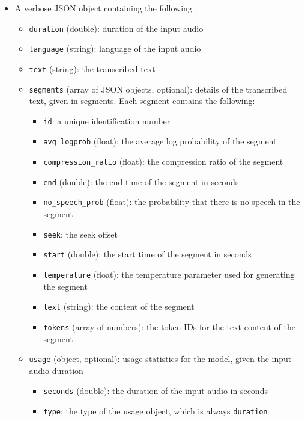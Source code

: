 \documentclass[12pt]{article}
\begin{document}
\begin{itemize}
    \item A verbose JSON object containing the following \citep{openai-create-transcription}:
    \begin{itemize}
        \item \texttt{duration} (double): duration of the input audio
        \item \texttt{language} (string): language of the input audio
        \item \texttt{text} (string): the transcribed text
        \item \texttt{segments} (array of JSON objects, optional): details of the transcribed text, given in segments. Each segment contains the following:
        \begin{itemize}
            \item \texttt{id}: a unique identification number
            \item \texttt{avg\_logprob} (float): the average log probability of the segment
            \item \texttt{compression\_ratio} (float): the compression ratio of the segment
            \item \texttt{end} (double): the end time of the segment in seconds
            \item \texttt{no\_speech\_prob} (float): the probability that there is no speech in the segment
            \item \texttt{seek}: the seek offset
            \item \texttt{start} (double): the start time of the segment in seconds
            \item \texttt{temperature} (float): the temperature parameter used for generating the segment
            \item \texttt{text} (string): the content of the segment
            \item \texttt{tokens} (array of numbers): the token IDs for the text content of the segment
        \end{itemize}
        \item \texttt{usage} (object, optional): usage statistics for the model, given the input audio duration
        \begin{itemize}
            \item \texttt{seconds} (double): the duration of the input audio in seconds
            \item \texttt{type}: the type of the usage object, which is always \texttt{duration}

\end{itemize}
\end{itemize}
\end{itemize}
\end{document}
